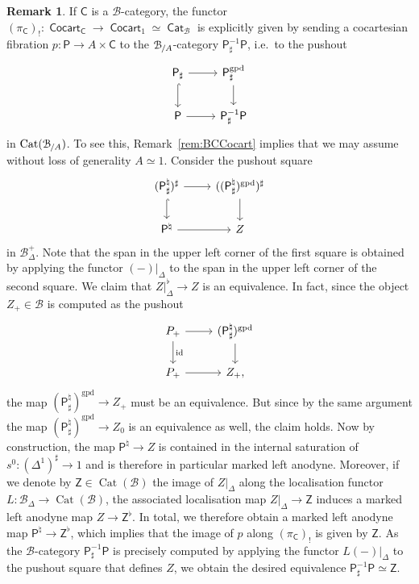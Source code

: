 \documentclass[reqno]{amsart}
\numberwithin{equation}{subsection}
\theoremstyle{plain}
\theoremstyle{definition}
\newtheorem{remark}[equation]{Remark}
\let\scr=\mathcal
\def\BB{\scr B}
\DeclareMathOperator{\id}{id}
\DeclareMathOperator{\Cat}{Cat}
\DeclareMathOperator{\ICat}{\mathsf{Cat}}
\DeclareMathOperator{\ICocart}{\mathsf{Cocart}}
\newcommand{\gp}{\mathrm{gpd}}
\newcommand{\Over}[2]{#1_{\hspace{-1pt}/#2}}
\newcommand{\I}[1]{\mathsf{#1}}
\newcommand{\Simp}[1]{#1_{\Delta}}
\newcommand{\mSimp}[1]{#1_{\Delta}^+}
\begin{document}
\begin{remark}
	\label{rem:LeftAdjointPullbackCocartPoint}
	If $\I{C}$ is a $\BB$-category, the functor $(\pi_{\I{C}})_!\colon\ICocart_{\I{C}}\to\ICocart_{1}\simeq\ICat_{\BB}$ is explicitly given by sending a cocartesian fibration $p\colon \I{P}\to A\times\I{C}$ to the $\Over{\BB}{A}$-category $\I{P}_\sharp^{-1}\I{P}$, i.e.\ to the pushout
	\begin{equation*}
	\begin{tikzcd}
	\I{P}_\sharp\arrow[r]\arrow[d, hookrightarrow] & \I{P}_\sharp^\gp\arrow[d]\\
	\I{P}\arrow[r] & \I{P}_\sharp^{-1}\I{P}
	\end{tikzcd}
	\end{equation*}
	in $\Cat(\Over{\BB}{A})$. To see this, Remark~\ref{rem:BCCocart} implies that we may assume without loss of generality $A\simeq 1$. Consider the pushout square
	\begin{equation*}
	\begin{tikzcd}
		(\I{P}^\natural_\sharp)^\sharp\arrow[r]\arrow[d, hookrightarrow] & ((\I{P}^\natural_\sharp)^\gp)^\sharp\arrow[d]\\
		\I{P}^\natural\arrow[r] & Z
	\end{tikzcd}
	\end{equation*}
	in $\mSimp{\BB}$. Note that the span in the upper left corner of the first square is obtained by applying the functor $(-)\vert_{\Delta}$ to the span in the upper left corner of the second square. We claim that $Z\vert_{\Delta}^\flat\to Z$ is an equivalence. In fact, since the object $Z_+\in\BB$ is computed as the pushout
	\begin{equation*}
	\begin{tikzcd}
	P_+\arrow[d, "\id"]\arrow[r] & (\I{P}^\natural_\sharp)^\gp\arrow[d]\\
	P_+\arrow[r] & Z_+,
	\end{tikzcd}
	\end{equation*}
	the map $(\I{P}^\natural_\sharp)^\gp\to Z_+$ must be an equivalence. But since by the same argument the map $(\I{P}^\natural_\sharp)^\gp\to Z_0$ is an equivalence as well, the claim holds. Now by construction, the map $\I{P}^\natural\to Z$ is contained in the internal saturation of $s^0\colon (\Delta^1)^\sharp\to 1$ and is therefore in particular marked left anodyne. Moreover, if we denote by $\I{Z}\in\Cat(\BB)$ the image of $Z\vert_{\Delta}$ along the localisation functor $L\colon\Simp{\BB}\to\Cat(\BB)$, the associated localisation map $Z\vert_{\Delta}\to\I{Z}$ induces a marked left anodyne map $Z\to \I{Z}^\flat$. In total, we therefore obtain a marked left anodyne map $\I{P}^\natural\to \I{Z}^\flat$, which implies that the image of $p$ along $(\pi_{\I{C}})_!$ is given by $\I{Z}$. As the $\BB$-category $\I{P}_\sharp^{-1}\I{P}$ is precisely computed by applying the functor $L(-)\vert_{\Delta}$ to the pushout square that defines $Z$, we obtain the desired equivalence $\I{P}_\sharp^{-1}\I{P}\simeq \I{Z}$.
\end{remark}
\end{document}
